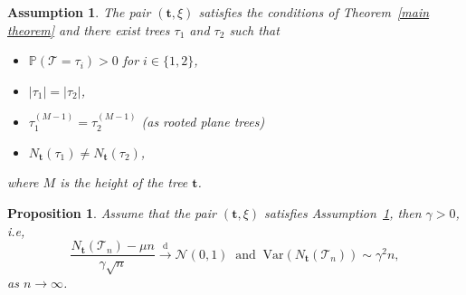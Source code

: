 \documentclass[article]{amsart}
\newcommand{\tc}{\mathcal{T}}
\newcommand{\st}{\textbf{t}}
\newcommand\dto{\overset{\mathrm{d}}{\to}}
\newtheorem{proposition}[theorem]{Proposition}
\newtheorem{assumption}{Assumption}
\theoremstyle{definition}
\theoremstyle{remark}
\begin{document}
\begin{assumption}\label{ass:1}
        The pair $(\st,\xi)$ satisfies the conditions of Theorem~\ref{main theorem} and there exist trees $\tau_1$ and $\tau_2$ such that 
\begin{itemize}
    \item[(A1)] $\mathbb{P}(\tc=\tau_i)>0$ for $i\in \{1,2\}$,
    \item[(A2)] $|\tau_1|=|\tau_2|$,
    \item[(A3)] $\tau_1^{(M-1)}=\tau_2^{(M-1)}$ (as rooted plane trees)
    \item[(A4)] $N_{\st}(\tau_1)\neq N_{\st}(\tau_2) $,
\end{itemize}
where $M$ is the height of the tree $\st$.
\end{assumption}
    
\begin{proposition}\label{prop:gamneq0}
    Assume that the pair $(\st,\xi)$ satisfies Assumption~\ref{ass:1}, then $\gamma> 0$, i.e, 
    \[
    \frac{N_{\st}(\tc_n)-\mu n}{\gamma \sqrt{n}}\dto \mathcal{N}(0,1) \ \text{ and }\ \mathrm{Var}(N_{\st}(\tc_n))\sim \gamma^2 n,
    \]
    as $n\to\infty$.
\end{proposition}
\end{document}
